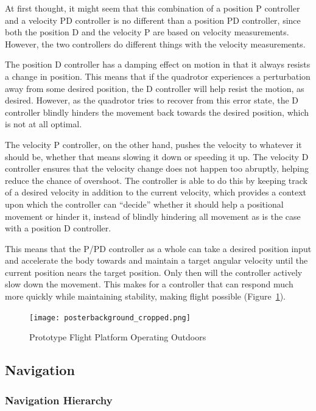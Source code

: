 \documentclass[12pt,letterpaper]{article}
\begin{document}
At first thought, it might seem that this combination of a position P
controller and a velocity PD controller is no different than a position PD
controller, since both the position D and the velocity P are based on velocity
measurements. However, the two controllers do different things with the
velocity measurements.

The position D controller has a damping effect on motion in that it always
resists a change in position. This means that if the quadrotor experiences a
perturbation away from some desired position, the D controller will help resist
the motion, as desired. However, as the quadrotor tries to recover from this
error state, the D controller blindly hinders the movement back towards the
desired position, which is not at all optimal.

The velocity P controller, on the other hand, pushes the velocity to whatever
it should be, whether that means slowing it down or speeding it up. The
velocity D controller ensures that the velocity change does not happen too
abruptly, helping reduce the chance of overshoot. The controller is able to do
this by keeping track of a desired velocity in addition to the current
velocity, which provides a context upon which the controller can ``decide''
whether it should help a positional movement or hinder it, instead of blindly
hindering all movement as is the case with a position D controller.

This means that the P/PD controller as a whole can take a desired position
input and accelerate the body towards and maintain a target angular velocity
until the current position nears the target position. Only then will the
controller actively slow down the movement. This makes for a controller that
can respond much more quickly while maintaining stability, making flight
possible (Figure~\ref{fig:flight}).

\begin{figure}[h!]
    \centering
    \texttt{[image: posterbackground\_cropped.png]}
    \caption{Prototype Flight Platform Operating Outdoors}
    \label{fig:flight}
\end{figure}


\subsection*{Navigation}

\subsubsection*{Navigation Hierarchy}
\end{document}
